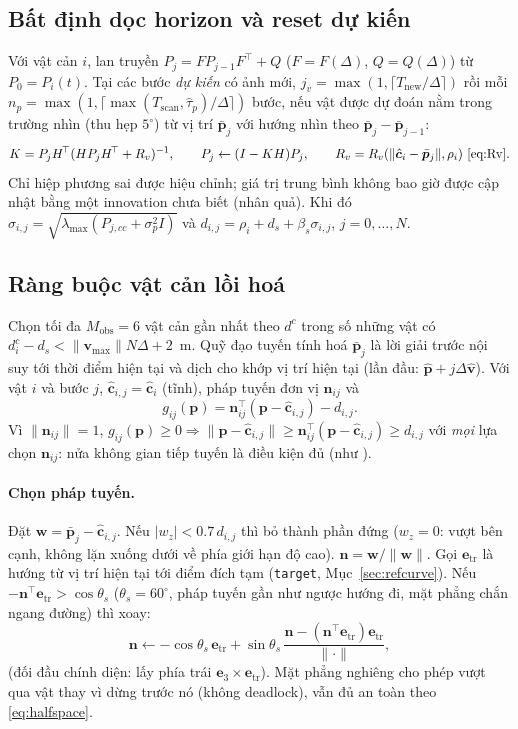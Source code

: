 \documentclass[11pt,a4paper]{article}
\numberwithin{equation}{section}
\newcommand{\vb}[1]{\bm{#1}}
\newcommand{\T}{^{\!\top}}
\newcommand{\code}[1]{\texttt{\small #1}}
\newcommand{\lmax}{\lambda_{\max}}
\theoremstyle{definition}
\theoremstyle{plain}
\theoremstyle{remark}
\begin{document}
\subsection{Bất định dọc horizon và reset dự kiến}
\label{sec:reset}
Với vật cản $i$, lan truyền $P_j=FP_{j-1}F\T+Q$ ($F=F(\Delta)$, $Q=Q(\Delta)$) từ $P_0=P_i(t)$. Tại các bước \emph{dự kiến} có ảnh mới, $j_v=\max(1,\lceil T_{\text{new}}/\Delta\rceil)$ rồi mỗi $n_p=\max(1,\lceil\max(T_{\text{scan}},\hat\tau_p)/\Delta\rceil)$ bước, nếu vật được dự đoán nằm trong trường nhìn (thu hẹp $5^\circ$) từ vị trí $\bar{\vb p}_j$ với hướng nhìn theo $\bar{\vb p}_j-\bar{\vb p}_{j-1}$:
\begin{equation}
K=P_jH\T(HP_jH\T+R_v)^{-1},\qquad P_j\leftarrow(I-KH)P_j,\qquad R_v=R_v(\|\hat{\vb c}_i-\bar{\vb p}_j\|,\rho_i)\ \eqref{eq:Rv}. \label{eq:reset}
\end{equation}
Chỉ hiệp phương sai được hiệu chỉnh; giá trị trung bình không bao giờ được cập nhật bằng một innovation chưa biết (nhân quả). Khi đó $\sigma_{i,j}=\sqrt{\lmax(P_{j,cc}+\sigma_p^2I)}$ và $d_{i,j}=\rho_i+d_s+\beta_s\sigma_{i,j}$, $j=0,\dots,N$.

\subsection{Ràng buộc vật cản lồi hoá}
\label{sec:halfspace}
Chọn tối đa $M_{\text{obs}}=6$ vật cản gần nhất theo $d^c$ trong số những vật có $d^c_i-d_s<\|\vb v_{\max}\|N\Delta+2$~m. Quỹ đạo tuyến tính hoá $\bar{\vb p}_j$ là lời giải trước nội suy tới thời điểm hiện tại và dịch cho khớp vị trí hiện tại (lần đầu: $\hat{\vb p}+j\Delta\hat{\vb v}$). Với vật $i$ và bước $j$, $\hat{\vb c}_{i,j}=\hat{\vb c}_i$ (tĩnh), pháp tuyến đơn vị $\vb n_{ij}$ và
\begin{equation}
g_{ij}(\vb p)=\vb n_{ij}\T(\vb p-\hat{\vb c}_{i,j})-d_{i,j}. \label{eq:halfspace}
\end{equation}
Vì $\|\vb n_{ij}\|=1$, $g_{ij}(\vb p)\ge0\Rightarrow\|\vb p-\hat{\vb c}_{i,j}\|\ge\vb n_{ij}\T(\vb p-\hat{\vb c}_{i,j})\ge d_{i,j}$ với \emph{mọi} lựa chọn $\vb n_{ij}$: nửa không gian tiếp tuyến là điều kiện đủ (như \cite{zhu2019chance}).

\paragraph{Chọn pháp tuyến.} Đặt $\vb w=\bar{\vb p}_j-\hat{\vb c}_{i,j}$. Nếu $|w_z|<0.7\,d_{i,j}$ thì bỏ thành phần đứng ($w_z=0$: vượt bên cạnh, không lặn xuống dưới về phía giới hạn độ cao). $\vb n=\vb w/\|\vb w\|$. Gọi $\vb e_{\text{tr}}$ là hướng từ vị trí hiện tại tới điểm đích tạm (\code{target}, Mục~\ref{sec:refcurve}). Nếu $-\vb n\T\vb e_{\text{tr}}>\cos\theta_s$ ($\theta_s=60^\circ$, pháp tuyến gần như ngược hướng đi, mặt phẳng chắn ngang đường) thì xoay:
\begin{equation}
\vb n\leftarrow-\cos\theta_s\,\vb e_{\text{tr}}+\sin\theta_s\,\frac{\vb n-(\vb n\T\vb e_{\text{tr}})\vb e_{\text{tr}}}{\|\cdot\|}, \label{eq:tilt}
\end{equation}
(đối đầu chính diện: lấy phía trái $\vb e_3\times\vb e_{\text{tr}}$). Mặt phẳng nghiêng cho phép vượt qua vật thay vì dừng trước nó (không deadlock), vẫn đủ an toàn theo \eqref{eq:halfspace}.
\end{document}
